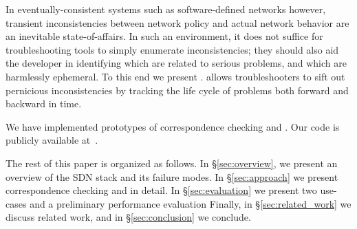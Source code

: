 In eventually-consistent systems such as software-defined
networks however, transient inconsistencies between network policy and actual network
behavior are an inevitable state-of-affairs.
In such an environment, it does not suffice for troubleshooting tools to
simply enumerate inconsistencies; they should also aid the developer
in identifying which are related to serious problems, and which are
harmlessly ephemeral. To this end we present \simulator.
\Simulator allows troubleshooters 
to sift out pernicious inconsistencies by tracking the life cycle of problems 
both forward and backward in time.

We have implemented prototypes
of correspondence checking and \simulator. Our code is publicly available
at~\cite{github}.

The rest of this paper is organized as follows. In \S\ref{sec:overview},
we present an overview of the SDN stack and its failure modes.
In \S\ref{sec:approach} we present correspondence checking and
\simulator in detail. In \S\ref{sec:evaluation} we present
two use-cases and a preliminary performance evaluation
Finally, in \S\ref{sec:related_work} we discuss related work,
and in \S\ref{sec:conclusion} we conclude.
